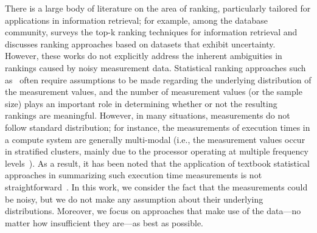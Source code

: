 \documentclass[acmsmall,screen, review]{acmart}
\begin{document}
There is a large body of literature on the area of ranking, particularly tailored for applications in information retrieval; for example,  among the database community, \cite{ilyas2008survey} surveys the top-k ranking techniques for information retrieval and ~\cite{li2010ranking} discusses ranking approaches based on datasets that exhibit uncertainty. However, these works do not explicitly address the inherent ambiguities in rankings caused by noisy measurement data. Statistical ranking approaches such as~\cite{szekli1995stochastic} often require assumptions to be made regarding the underlying distribution of the measurement values, and the number of measurement values (or the sample size) plays an important role in determining whether or not the resulting rankings are meaningful.
 However, in many situations, measurements do not follow  standard distribution; for instance, the measurements of execution times in a compute system  are generally multi-modal (i.e., the measurement values occur in stratified clusters, mainly due to the processor operating at multiple frequency levels~\cite{charles2009evaluation}). As a result, it has been noted that the application of  textbook statistical approaches in summarizing such execution time measurements is not straightforward~\cite{chen2015statistical,hoefler2015scientific}. In this work, we consider the fact that the measurements could be noisy, but we do not make any assumption about their underlying distributions. Moreover, we focus on approaches that make use of the data---no matter how insufficient they are---as best as possible. 
\end{document}
